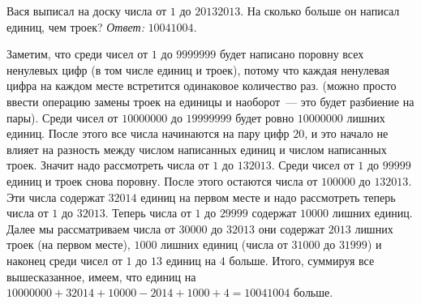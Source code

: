 \problem
Вася выписал на доску числа от $1$ до $20132013$.
На сколько больше он написал единиц, чем троек?
\solution
\emph{Ответ:} $10041004$.
\par
Заметим, что среди чисел от $1$ до $9999999$ будет написано поровну всех
ненулевых цифр (в том числе единиц и троек), потому что каждая ненулевая цифра
на каждом месте встретится одинаковое количество раз.
(можно просто ввести операцию замены троек на единицы и наоборот~--- это будет
разбиение на пары).
Среди чисел от $10000000$ до $19999999$ будет ровно $10000000$ лишних единиц.
После этого все числа начинаются на пару цифр $20$, и это начало не влияет на
разность между числом написанных единиц и числом написанных троек.
Значит надо рассмотреть числа от $1$ до $132013$.
Среди чисел от $1$ до $99999$ единиц и троек снова поровну.
После этого остаются числа от $100000$ до $132013$.
Эти числа содержат $32014$ единиц на первом месте и надо рассмотреть теперь
числа от $1$ до $32013$.
Теперь числа от $1$ до $29999$ содержат $10000$ лишних единиц.
Далее мы рассматриваем числа от $30000$ до $32013$ они содержат $2013$ лишних
троек (на первом месте), $1000$ лишних единиц (числа от $31000$ до $31999$) и
наконец среди чисел от $1$ до $13$ единиц на $4$ больше.
Итого, суммируя все вышесказанное, имеем, что единиц на
$10000000 + 32014 + 10000 - 2014 + 1000 + 4 = 10041004$ больше.
\endproblem
